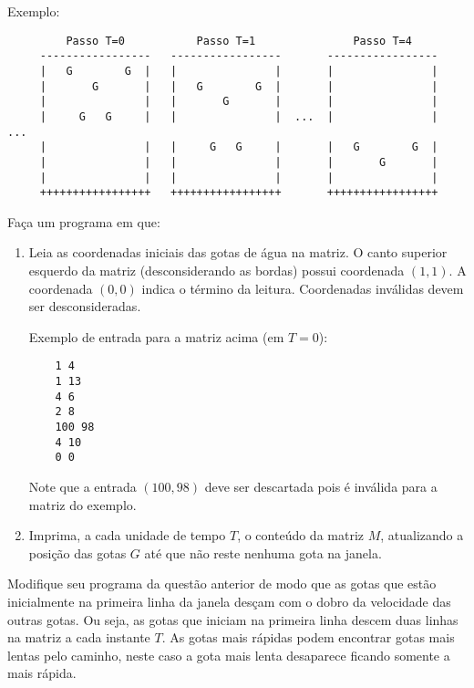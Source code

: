 Exemplo:
\begin{small}
\begin{verbatim}
         Passo T=0           Passo T=1               Passo T=4
     -----------------   -----------------       ----------------- 
     |   G        G  |   |               |       |               |
     |       G       |   |   G        G  |       |               |
     |               |   |       G       |       |               |
     |     G   G     |   |               |  ...  |               |  ...
     |               |   |     G   G     |       |   G        G  |
     |               |   |               |       |       G       |
     |               |   |               |       |               |
     +++++++++++++++++   +++++++++++++++++       +++++++++++++++++
\end{verbatim}
\end{small}

Faça um programa em que:

\begin {enumerate}

\item 
Leia as coordenadas iniciais das gotas de água na matriz. O canto
superior esquerdo da matriz (desconsiderando as bordas) possui
coordenada $(1,1)$. A coordenada $(0,0)$ indica o término da
leitura. Coordenadas inválidas devem ser desconsideradas.

Exemplo de entrada para a matriz acima (em $T=0$):
\begin{small}
\begin{verbatim}
    1 4
    1 13
    4 6
    2 8
    100 98
    4 10
    0 0
\end{verbatim}
\end{small}
Note que a entrada $(100,98)$ deve ser descartada pois é inválida para
a matriz do exemplo.

\item 
Imprima, a cada unidade de tempo $T$, o conteúdo da matriz $M$,
atualizando a posição das gotas $G$ até que não reste nenhuma gota na
janela.
\end{enumerate}


\item Modifique seu programa da questão anterior de modo que as gotas que estão
inicialmente na primeira linha da janela desçam com o dobro da
velocidade das outras gotas. Ou seja, as gotas que iniciam na primeira
linha descem duas linhas na matriz a cada instante $T$. As gotas mais
rápidas podem encontrar gotas mais lentas pelo caminho, neste caso a
gota mais lenta desaparece ficando somente a mais rápida.

